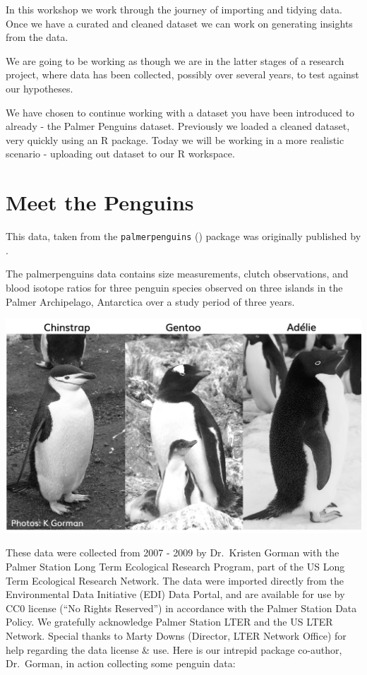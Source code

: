 \documentclass[
]{book}
\begin{document}
In this workshop we work through the journey of importing and tidying data. Once we have a curated and cleaned dataset we can work on generating insights from the data.

We are going to be working as though we are in the latter stages of a research project, where data has been collected, possibly over several years, to test against our hypotheses.

We have chosen to continue working with a dataset you have been introduced to already - the Palmer Penguins dataset. Previously we loaded a cleaned dataset, very quickly using an R package. Today we will be working in a more realistic scenario - uploading out dataset to our R workspace.

\hypertarget{meet-the-penguins}{%
\section{Meet the Penguins}\label{meet-the-penguins}}

This data, taken from the \texttt{palmerpenguins} (\citet{R-palmerpenguins}) package was originally published by \citet{Antarctic}.

The palmerpenguins data contains size measurements, clutch observations, and blood isotope ratios for three penguin species observed on three islands in the Palmer Archipelago, Antarctica over a study period of three years.

\includegraphics[width=0.8\linewidth]{images/gorman-penguins}

These data were collected from 2007 - 2009 by Dr.~Kristen Gorman with the Palmer Station Long Term Ecological Research Program, part of the US Long Term Ecological Research Network. The data were imported directly from the Environmental Data Initiative (EDI) Data Portal, and are available for use by CC0 license (``No Rights Reserved'') in accordance with the Palmer Station Data Policy. We gratefully acknowledge Palmer Station LTER and the US LTER Network. Special thanks to Marty Downs (Director, LTER Network Office) for help regarding the data license \& use. Here is our intrepid package co-author, Dr.~Gorman, in action collecting some penguin data:
\end{document}
